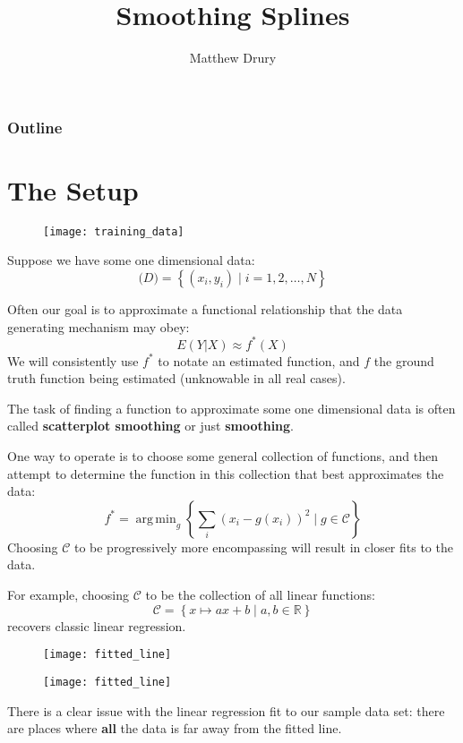 \documentclass{beamer}
\title{Smoothing Splines}
\author{Matthew Drury}
\DeclareMathOperator*{\argmin}{arg\,min}
\begin{document}
%
\begin{frame}
  \titlepage
\end{frame}
%
\begin{frame}
  \frametitle{Outline}
  \tableofcontents
\end{frame}
%
\section{The Setup}
%
\begin{frame}
  \begin{figure}
    \texttt{[image: training\_data]}
  \end{figure}
  Suppose we have some one dimensional data:
  $$\mathcal(D) = \left\{ (x_i, y_i) \mid i = 1,2,\ldots,N \right\}$$
\end{frame}
%
\begin{frame}
  Often our goal is to approximate a functional relationship that the data generating mechanism may obey:
  $$E(Y|X) \approx f^*(X)$$
  We will consistently use $f^*$ to notate an estimated function, and $f$ the ground truth function being estimated (unknowable in all real cases).
\end{frame}
%
\begin{frame}
  The task of finding a function to approximate some one dimensional data is often called \textbf{scatterplot smoothing} or just \textbf{smoothing}.
\end{frame}
%
\begin{frame}
  One way to operate is to choose some general collection of functions, and then attempt to determine the function in this collection that best approximates the data:
  $$ f^* = \argmin_{g} \left\{ \sum_i (x_i - g(x_i))^2 \mid g \in \mathcal{C} \right\} $$
  Choosing $\mathcal{C}$ to be progressively more encompassing will result in closer fits to the data.
\end{frame}
%
\begin{frame}
  For example, choosing $\mathcal{C}$ to be the collection of all linear functions:
  $$ \mathcal{C} = \left\{ x \mapsto ax + b \mid a,b \in \mathbb{R} \right\} $$
recovers classic linear regression.
  \begin{figure}
    \texttt{[image: fitted\_line]}
  \end{figure}
\end{frame}
%
\begin{frame}
  \begin{figure}
    \texttt{[image: fitted\_line]}
  \end{figure}
  There is a clear issue with the linear regression fit to our sample data set: there are places where \textbf{all} the data is far away from the fitted line.
\end{frame}
\end{document}
